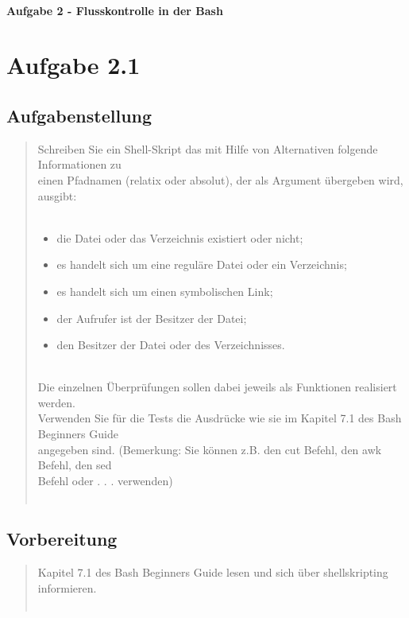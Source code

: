 \newpage

\paragraph{\LARGE Aufgabe 2 - Flusskontrolle in der Bash}

\section{Aufgabe 2.1}
	\subsection{Aufgabenstellung}
		\begin{quote}
			Schreiben Sie ein Shell-Skript das mit Hilfe von Alternativen folgende Informationen zu\\
			einen Pfadnamen (relatix oder absolut), der als Argument \"ubergeben wird, ausgibt:\\ \\
			\begin{itemize}
				\item die Datei oder das Verzeichnis existiert oder nicht;\\
				\item es handelt sich um eine regul\"are Datei oder ein Verzeichnis;\\
				\item es handelt sich um einen symbolischen Link;\\
				\item der Aufrufer ist der Besitzer der Datei;\\
				\item den Besitzer der Datei oder des Verzeichnisses.\\ \\
			\end{itemize}
			Die einzelnen \"Uberpr\"ufungen sollen dabei jeweils als Funktionen realisiert werden.\\
			Verwenden Sie f\"ur die Tests die Ausdr\"ucke wie sie im Kapitel 7.1 des Bash Beginners Guide\\
			angegeben sind. (Bemerkung: Sie k\"onnen z.B. den cut Befehl, den awk Befehl, den sed\\
			Befehl oder . . . verwenden)\\ \\
		\end{quote}
	\subsection{Vorbereitung}
		\begin{quote}
			Kapitel 7.1 des Bash Beginners Guide lesen und sich \"uber shellskripting informieren.\\ \\
		\end{quote}
